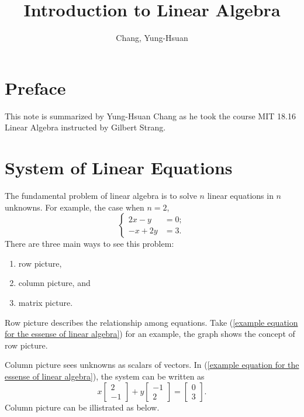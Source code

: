 \documentclass[11pt]{article}
\title{\textbf{Introduction to Linear Algebra}}
\author{Chang, Yung-Hsuan}
\theoremstyle{break}
\theoremstyle{no_label}
\numberwithin{equation}{section}
\begin{document}
\maketitle
\thispagestyle{empty}
\newpage
{}
\newpage
{}
{}
\tableofcontents
\newpage

{}
\section*{Preface}

This note is summarized by Yung-Hsuan Chang as he took the course MIT 18.16 Linear Algebra instructed by Gilbert Strang.

\newpage
{}

\section{System of Linear Equations}

The fundamental problem of linear algebra is to solve $n$ linear equations in $n$ unknowns. For example, the case when $n=2$,
\begin{equation}\label{example equation for the essense of linear algebra}
    \left\{\begin{array}{rl}
        2x-y\!\!\!&=0;\\
        -x+2y\!\!\!&=3.
    \end{array}\right.
\end{equation}
There are three main ways to see this problem:
\begin{enumerate}
    \item row picture,
    \item column picture, and
    \item matrix picture.
\end{enumerate}

Row picture describes the relationship among equations. Take (\ref{example equation for the essense of linear algebra}) for an example, the graph shows the concept of row picture.

Column picture sees unknowns as scalars of vectors. In (\ref{example equation for the essense of linear algebra}), the system can be written as 
\begin{equation}\label{example equation in form of vectors}
    x\begin{bmatrix}
        2 \\ -1
    \end{bmatrix}+y\begin{bmatrix}
        -1 \\ 2
    \end{bmatrix}=\begin{bmatrix}
        0 \\ 3
    \end{bmatrix}.
\end{equation}
Column picture can be illistrated as below.
\end{document}
